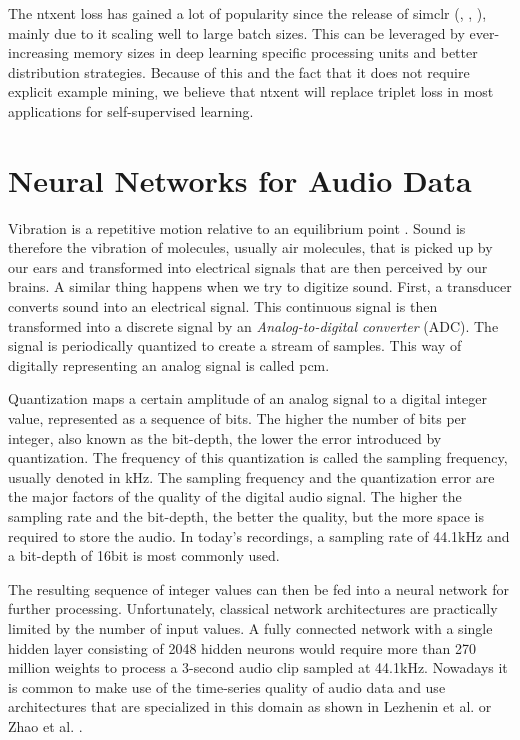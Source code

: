 The \gls{ntxent} loss has gained a lot of popularity since the release of \gls{simclr} (\cite{tu2020aag}, \cite{giorgi2020declutr}, \cite{apoorv2020speechembeddings}), mainly due to it scaling well to large batch sizes. This can be leveraged by ever-increasing memory sizes in deep learning specific processing units and better distribution strategies. Because of this and the fact that it does not require explicit example mining, we believe that \gls{ntxent} will replace triplet loss in most applications for self-supervised learning.

\section{Neural Networks for Audio Data}\label{sec:nn_audio}

Vibration is a repetitive motion relative to an equilibrium point \cite{nopdanai2017vibration}. Sound is therefore the vibration of molecules, usually air molecules, that is picked up by our ears and transformed into electrical signals that are then perceived by our brains. A similar thing happens when we try to digitize sound. First, a transducer converts sound into an electrical signal. This continuous signal is then transformed into a discrete signal by an \textit{Analog-to-digital converter} (ADC). The signal is periodically quantized to create a stream of samples. This way of digitally representing an analog signal is called \gls{pcm}.

Quantization maps a certain amplitude of an analog signal to a digital integer value, represented as a sequence of bits. The higher the number of bits per integer, also known as the bit-depth, the lower the error introduced by quantization. The frequency of this quantization is called the sampling frequency, usually denoted in kHz. The sampling frequency and the quantization error are the major factors of the quality of the digital audio signal. The higher the sampling rate and the bit-depth, the better the quality, but the more space is required to store the audio. In today's recordings, a sampling rate of 44.1kHz and a bit-depth of 16bit is most commonly used.

The resulting sequence of integer values can then be fed into a neural network for further processing. Unfortunately, classical network architectures are practically limited by the number of input values. A fully connected network with a single hidden layer consisting of 2048 hidden neurons would require more than 270 million weights to process a 3-second audio clip sampled at 44.1kHz. Nowadays it is common to make use of the time-series quality of audio data and use architectures that are specialized in this domain as shown in Lezhenin et al. \cite{lezhenin2019urban} or Zhao et al. \cite{zhao2019speechtransformer}.

